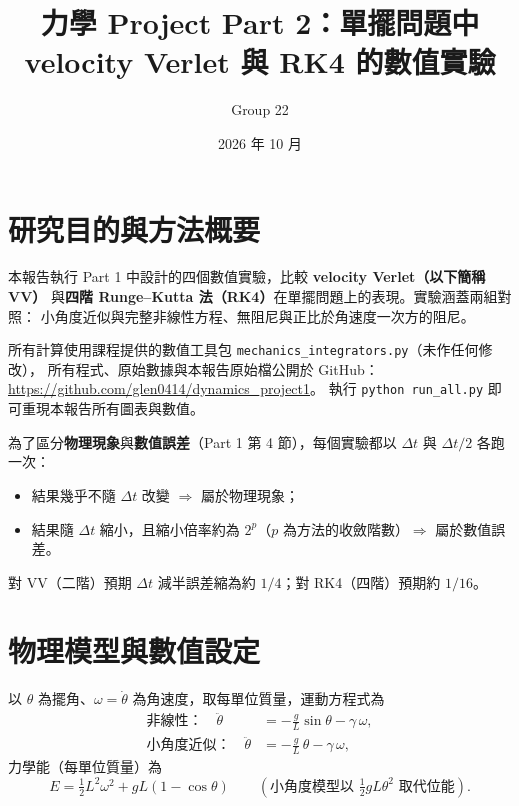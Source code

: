 \documentclass[11pt,a4paper]{article}
\title{力學 Project Part 2：單擺問題中\\velocity Verlet 與 RK4 的數值實驗}
\author{Group 22}
\date{2026 年 10 月}
\newcommand{\dt}{\Delta t}
\begin{document}
\maketitle

\section{研究目的與方法概要}

本報告執行 Part 1 中設計的四個數值實驗，比較 \textbf{velocity Verlet（以下簡稱 VV）}
與\textbf{四階 Runge--Kutta 法（RK4）}在單擺問題上的表現。實驗涵蓋兩組對照：
小角度近似與完整非線性方程、無阻尼與正比於角速度一次方的阻尼。

所有計算使用課程提供的數值工具包 \texttt{mechanics\_integrators.py}（未作任何修改），
所有程式、原始數據與本報告原始檔公開於 GitHub：
\url{https://github.com/glen0414/dynamics_project1}。
執行 \texttt{python run\_all.py} 即可重現本報告所有圖表與數值。

為了區分\textbf{物理現象}與\textbf{數值誤差}（Part 1 第 4 節），每個實驗都以 $\dt$ 與 $\dt/2$ 各跑一次：
\begin{itemize}
  \item 結果幾乎不隨 $\dt$ 改變 $\Rightarrow$ 屬於物理現象；
  \item 結果隨 $\dt$ 縮小，且縮小倍率約為 $2^p$（$p$ 為方法的收斂階數）$\Rightarrow$ 屬於數值誤差。
\end{itemize}
對 VV（二階）預期 $\dt$ 減半誤差縮為約 $1/4$；對 RK4（四階）預期約 $1/16$。

\section{物理模型與數值設定}

以 $\theta$ 為擺角、$\omega=\dot\theta$ 為角速度，取每單位質量，運動方程式為
\begin{align}
  \text{非線性：}\quad \ddot\theta &= -\frac{g}{L}\sin\theta - \gamma\,\omega, \\
  \text{小角度近似：}\quad \ddot\theta &= -\frac{g}{L}\,\theta - \gamma\,\omega ,
\end{align}
力學能（每單位質量）為
\begin{equation}
  E = \tfrac12 L^2\omega^2 + gL(1-\cos\theta)
  \qquad\left(\text{小角度模型以 } \tfrac12 gL\theta^2 \text{ 取代位能}\right).
\end{equation}
\end{document}
